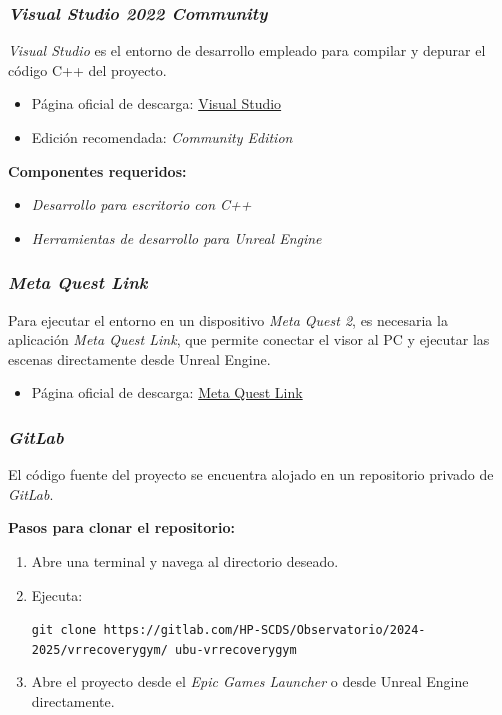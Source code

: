 \subsubsection*{\textit{Visual Studio 2022 Community}}

\textit{Visual Studio} es el entorno de desarrollo empleado para compilar y depurar el código C++ del proyecto.

\begin{itemize}
    \item Página oficial de descarga: \href{https://visualstudio.microsoft.com/es/}{Visual Studio}
    \item Edición recomendada: \textit{Community Edition}
\end{itemize}

\textbf{Componentes requeridos:}
\begin{itemize}
    \item \textit{Desarrollo para escritorio con C++}
    \item \textit{Herramientas de desarrollo para Unreal Engine}
\end{itemize}

\subsubsection*{\textit{Meta Quest Link}}

Para ejecutar el entorno en un dispositivo \textit{Meta Quest 2}, es necesaria la aplicación \textit{Meta Quest Link}, que permite conectar el visor al PC y ejecutar las escenas directamente desde Unreal Engine.

\begin{itemize}
    \item Página oficial de descarga: \href{https://www.meta.com/es-es/help/quest/1517439565442928/?srsltid=AfmBOoo5g0JE6USz6f9AFDuI3ggzFrRQl7LbQTSv9CvtSk7leU17CGWp}{Meta Quest Link}
\end{itemize}

\subsubsection*{\textit{GitLab}}

El código fuente del proyecto se encuentra alojado en un repositorio privado de \textit{GitLab}.

\textbf{Pasos para clonar el repositorio:}
\begin{enumerate}
    \item Abre una terminal y navega al directorio deseado.
    \item Ejecuta:
    
    \begin{small}
    \texttt{git clone https://gitlab.com/HP-SCDS/Observatorio/2024-2025/vrrecoverygym/
    ubu-vrrecoverygym}
    \end{small}
    \item Abre el proyecto desde el \textit{Epic Games Launcher} o desde Unreal Engine directamente.
\end{enumerate}

